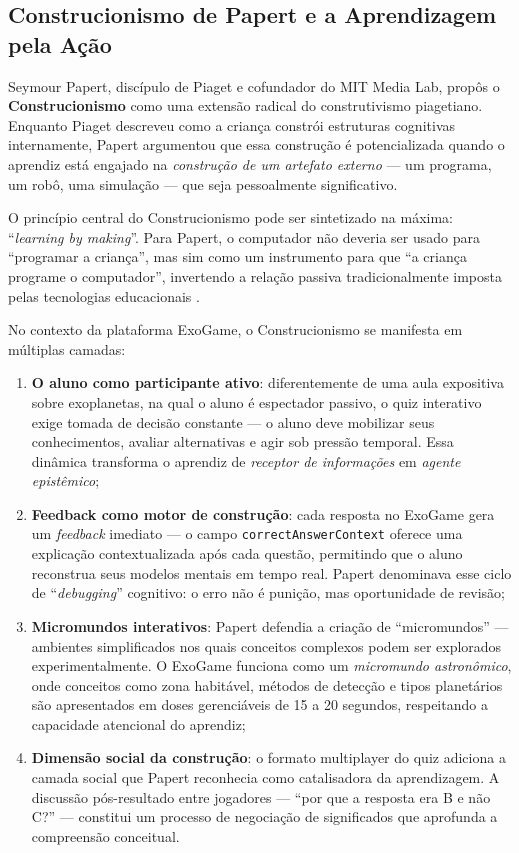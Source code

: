 \documentclass[
	12pt,
	openany,
	oneside,
	a4paper,
	english,
	brazil
]{abntex2}
\begin{document}
\subsection{Construcionismo de Papert e a Aprendizagem pela Ação}

Seymour Papert, discípulo de Piaget e cofundador do MIT Media Lab, propôs o \textbf{Construcionismo} como uma extensão radical do construtivismo piagetiano. Enquanto Piaget descreveu como a criança constrói estruturas cognitivas internamente, Papert \cite{papert1980, papert1993} argumentou que essa construção é potencializada quando o aprendiz está engajado na \textit{construção de um artefato externo} --- um programa, um robô, uma simulação --- que seja pessoalmente significativo.

O princípio central do Construcionismo pode ser sintetizado na máxima: ``\textit{learning by making}''. Para Papert, o computador não deveria ser usado para ``programar a criança'', mas sim como um instrumento para que ``a criança programe o computador'', invertendo a relação passiva tradicionalmente imposta pelas tecnologias educacionais \cite{papert1980}.

No contexto da plataforma ExoGame, o Construcionismo se manifesta em múltiplas camadas:

\begin{enumerate}
  \item \textbf{O aluno como participante ativo}: diferentemente de uma aula expositiva sobre exoplanetas, na qual o aluno é espectador passivo, o quiz interativo exige tomada de decisão constante --- o aluno deve mobilizar seus conhecimentos, avaliar alternativas e agir sob pressão temporal. Essa dinâmica transforma o aprendiz de \textit{receptor de informações} em \textit{agente epistêmico};

  \item \textbf{Feedback como motor de construção}: cada resposta no ExoGame gera um \textit{feedback} imediato --- o campo \texttt{correctAnswerContext} oferece uma explicação contextualizada após cada questão, permitindo que o aluno reconstrua seus modelos mentais em tempo real. Papert \cite{papert1993} denominava esse ciclo de ``\textit{debugging}'' cognitivo: o erro não é punição, mas oportunidade de revisão;

  \item \textbf{Micromundos interativos}: Papert defendia a criação de ``micromundos'' --- ambientes simplificados nos quais conceitos complexos podem ser explorados experimentalmente. O ExoGame funciona como um \textit{micromundo astronômico}, onde conceitos como zona habitável, métodos de detecção e tipos planetários são apresentados em doses gerenciáveis de 15 a 20 segundos, respeitando a capacidade atencional do aprendiz;

  \item \textbf{Dimensão social da construção}: o formato multiplayer do quiz adiciona a camada social que Papert reconhecia como catalisadora da aprendizagem. A discussão pós-resultado entre jogadores --- ``por que a resposta era B e não C?'' --- constitui um processo de negociação de significados que aprofunda a compreensão conceitual.
\end{enumerate}
\end{document}
